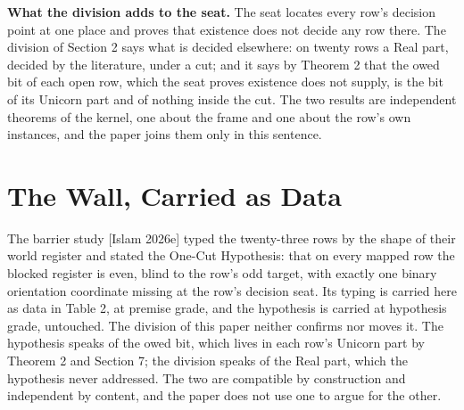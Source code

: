 \documentclass[10pt,twocolumn]{article}
\begin{document}
\textbf{What the division adds to the seat.} The seat locates every
row's decision point at one place and proves that existence does not
decide any row there. The division of Section 2 says what is decided
elsewhere: on twenty rows a Real part, decided by the literature, under
a cut; and it says by Theorem 2 that the owed bit of each open row,
which the seat proves existence does not supply, is the bit of its
Unicorn part and of nothing inside the cut. The two results are
independent theorems of the kernel, one about the frame and one about
the row's own instances, and the paper joins them only in this sentence.

\hypertarget{the-wall-carried-as-data}{%
\section{The Wall, Carried as Data}\label{the-wall-carried-as-data}}

The barrier study {[}Islam 2026e{]} typed the twenty-three rows by the
shape of their world register and stated the One-Cut Hypothesis: that on
every mapped row the blocked register is even, blind to the row's odd
target, with exactly one binary orientation coordinate missing at the
row's decision seat. Its typing is carried here as data in Table 2, at
premise grade, and the hypothesis is carried at hypothesis grade,
untouched. The division of this paper neither confirms nor moves it. The
hypothesis speaks of the owed bit, which lives in each row's Unicorn
part by Theorem 2 and Section 7; the division speaks of the Real part,
which the hypothesis never addressed. The two are compatible by
construction and independent by content, and the paper does not use one
to argue for the other.
\end{document}
